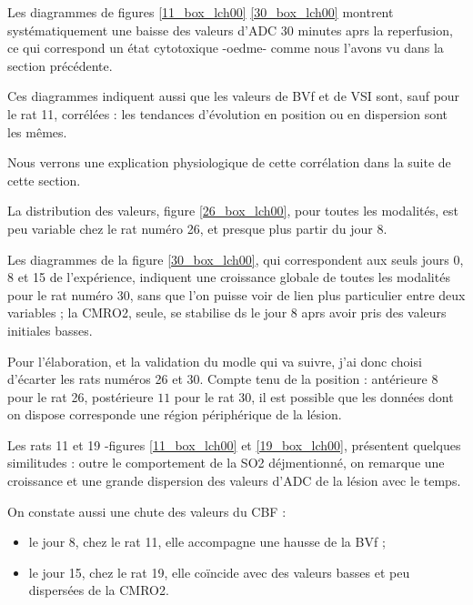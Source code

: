 \ligneinter
Les diagrammes de figures \ref{11_box_lch00}  \ref{30_box_lch00} montrent syst\'ematiquement une baisse des valeurs d'ADC 30 minutes aprs la reperfusion, %
ce qui correspond  un \'etat cytotoxique -oedme- comme nous l'avons vu dans la section pr\'ec\'edente.

\par
Ces diagrammes indiquent aussi que les valeurs de BVf et de VSI sont, sauf pour le rat 11, corr\'el\'ees : %
les tendances d'\'evolution en position ou en dispersion sont les m\^emes.

\par
Nous verrons une explication physiologique de cette corr\'elation dans la suite de cette section.

\etoile
La distribution des valeurs, figure \ref{26_box_lch00}, pour toutes les modalit\'es, est peu variable chez le rat num\'ero 26, et presque plus  partir du jour 8.

\par
Les diagrammes de la figure \ref{30_box_lch00}, qui correspondent aux seuls jours 0, 8 et 15 de l'exp\'erience, %
indiquent une croissance globale de toutes les modalit\'es pour le rat num\'ero 30, sans que l'on puisse voir de lien plus particulier entre deux variables ; %
la CMRO2, seule, se stabilise ds le jour 8 aprs avoir pris des valeurs initiales basses.

\par
Pour l'\'elaboration, et la validation du modle qui va suivre, j'ai donc choisi d'\'ecarter les rats num\'eros 26 et 30. %
Compte tenu de la position : ant\'erieure  $8$ pour le rat 26, post\'erieure  $11$ pour le rat 30, %
il est possible que les donn\'ees dont on dispose corresponde  une r\'egion p\'eriph\'erique de la l\'esion.

\etoile
Les rats 11 et 19 -figures \ref{11_box_lch00} et \ref{19_box_lch00}, pr\'esentent quelques similitudes : %
outre le comportement de la SO2 d\'ejmentionn\'e, on remarque une croissance et une grande dispersion des valeurs d'ADC de la l\'esion avec le temps.

\par
On constate aussi une chute des valeurs du CBF :
\begin{itemize}
\item le jour 8, chez le rat 11, elle accompagne une hausse de la BVf ;
\item le jour 15, chez le rat 19, elle co\"incide avec des valeurs basses et peu dispers\'ees de la CMRO2.
\end{itemize}

